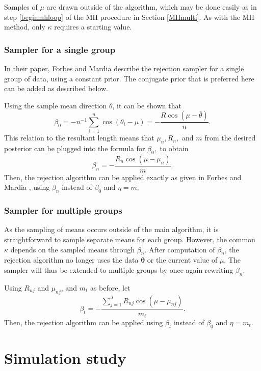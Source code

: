 \documentclass[]{gSCS2e}
\theoremstyle{plain}
\theoremstyle{definition}
\theoremstyle{remark}
\begin{document}
Samples of $\mu$ are drawn outside of the algorithm, which may be done easily as in step \ref{beginmhloop} of the MH procedure in Section \ref{MHmulti}. As with the MH method, only $\kappa$ requires a starting value. 

\subsubsection{Sampler for a single group}

In their paper, Forbes and Mardia \cite{forbes2014fast} describe the rejection sampler for a single group of data, using a constant prior. The conjugate prior that is preferred here can be added as described below. 

Using the sample mean direction $\bar{\theta}$, it can be shown that
$$ \beta_0 = - n^{-1} \sum_{i=1}^{n} \cos(\theta_i - \mu) = - \frac{R\cos (\mu - \bar\theta) }{n}.$$
This relation to the resultant length means that $\mu_n, R_n,$ and $m$ from the desired posterior can be plugged into the formula for $\beta_0,$ to obtain
$$\beta_n = - \frac{R_{n} \cos (\mu - \mu_{n})}{m}.$$
Then, the rejection algorithm can be applied exactly as given in Forbes and Mardia \cite{forbes2014fast}, using $\beta_n$ instead of $\beta_0$ and $\eta = m$.

\subsubsection{Sampler for multiple groups}

As the sampling of means occurs outside of the main algorithm, it is straightforward to sample separate means for each group. However, the common $\kappa$ depends on the sampled means through $\beta_n$. After computation of $\beta_n$, the rejection algorithm no longer uses the data $\boldsymbol\theta$ or the current value of $\mu$. The sampler will thus be extended to multiple groups by once again rewriting $\beta_n$. 

Using $R_{nj}$ and $\mu_{nj}$, and $m_t$ as before, let
$$\beta_t = -  \frac{\sum_{j=1}^{J} R_{nj} \cos (\mu - \mu_{nj})}{m_t}.$$
Then, the rejection algorithm can be applied using $\beta_t$ instead of $\beta_0$ and $\eta = m_t$.




\section{Simulation study \label{simstud}}
\end{document}
